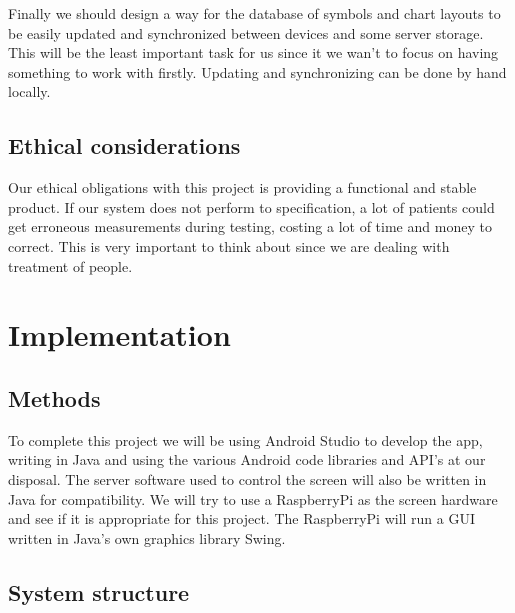 \documentclass[12pt,a4paper,notitlepage]{report}
\begin{document}
Finally we should design a way for the database of symbols and chart layouts to be easily updated and synchronized between devices and some server storage. This will be the least important task for us since it we wan't to focus on having something to work with firstly. Updating and synchronizing can be done by hand locally.

\section{Ethical considerations}

Our ethical obligations with this project is providing a functional and stable product. If our system does not perform to specification, a lot of patients could get erroneous measurements during testing, costing a lot of time and money to correct. This is very important to think about since we are dealing with treatment of people.


\chapter{Implementation}
\section{Methods}


To complete this project we will be using Android Studio to develop the app, writing in Java and using the various Android code libraries and API's at our disposal. The server software used to control the screen will also be written in Java for compatibility. We will try to use a RaspberryPi as the screen hardware and see if it is appropriate for this project. The RaspberryPi will run a GUI written in Java's own graphics library Swing. 


\section{System structure}
\end{document}
